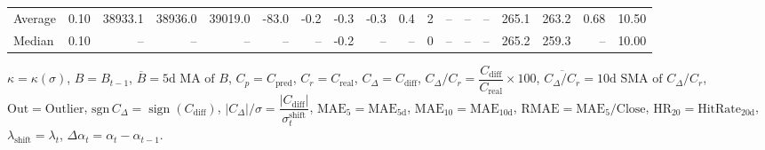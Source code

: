 \begin{threeparttable}
{\begin{tabular}{lrrrrrrrrrrrrrrrrr}
Average &     0.10 & 38933.1 & 38936.0 & 39019.0 &      -83.0 &           -0.2 &                      -0.3 &                     -0.3 &                 0.4 &              2 &         -- &        -- &             -- &            265.1 &               263.2 &            0.68 &                  10.50 \\
 Median &     0.10 &      -- &      -- &      -- &         -- &             -- &                      -0.2 &                       -- &                  -- &              0 &         -- &        -- &             -- &            265.2 &               259.3 &              -- &                  10.00 \\
\bottomrule
\end{tabular}
}
\begin{tablenotes}\footnotesize
\item $\kappa=\kappa(\sigma)$, $B=B_{t-1}$, $\overline{B}=\text{5d MA of }B$, $C_p=C_{\text{pred}}$, $C_r=C_{\text{real}}$, $C_\Delta=C_{\text{diff}}$, $C_\Delta/C_r=\dfrac{C_{\text{diff}}}{C_{\text{real}}}\times100$, $\overline{C_\Delta/C_r}=\text{10d SMA of }C_\Delta/C_r$, $\mathrm{Out}=\text{Outlier}$, $\mathrm{sgn}\,C_\Delta=\operatorname{sign}(C_{\text{diff}})$, $|C_\Delta|/\sigma=\dfrac{|C_{\text{diff}}|}{\sigma_t^{\text{shift}}}$, $\mathrm{MAE}_5=\mathrm{MAE}_{5\text{d}}$, $\mathrm{MAE}_{10}=\mathrm{MAE}_{10\text{d}}$, $\mathrm{RMAE}= \mathrm{MAE}_5 / \text{Close}$, $\mathrm{HR}_{20}=\mathrm{HitRate}_{20\text{d}}$, $\lambda_{\text{shift}}=\lambda_t$, $\Delta\alpha_t=\alpha_t-\alpha_{t-1}$.
\end{tablenotes}
\end{threeparttable}
\endgroup

